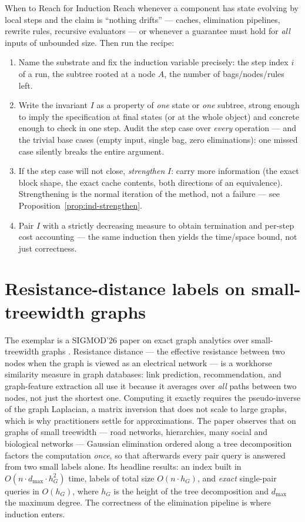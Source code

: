 \begin{reachbox}{When to Reach for Induction}
Reach whenever a component has state evolving by local steps and the claim is
``nothing drifts'' --- caches, elimination pipelines, rewrite rules, recursive
evaluators --- or whenever a guarantee must hold for \emph{all} inputs of unbounded
size. Then run the recipe:
\begin{enumerate}
\item Name the substrate and fix the induction variable precisely: the step index $i$
  of a run, the subtree rooted at a node $A$, the number of bags/nodes/rules left.
\item Write the invariant $I$ as a property of \emph{one} state or \emph{one} subtree,
  strong enough to imply the specification at final states (or at the whole object) and
  concrete enough to check in one step. Audit the step case over \emph{every} operation
  --- and the trivial base cases (empty input, single bag, zero eliminations): one
  missed case silently breaks the entire argument.
\item If the step case will not close, \emph{strengthen} $I$: carry more information
  (the exact block shape, the exact cache contents, both directions of an
  equivalence). Strengthening is the normal iteration of the method, not a failure ---
  see Proposition~\ref{prop:ind-strengthen}.
\item Pair $I$ with a strictly decreasing measure to obtain termination and per-step
  cost accounting --- the same induction then yields the time/space bound, not just
  correctness.
\end{enumerate}
\end{reachbox}

\section{Resistance-distance labels on small-treewidth graphs}
\label{sec:ind-resistance}

The exemplar is a SIGMOD'26 paper on exact graph analytics over small-treewidth graphs
\citep{sigmod26-307}. Resistance distance --- the effective resistance between two
nodes when the graph is viewed as an electrical network --- is a workhorse similarity
measure in graph databases: link prediction, recommendation, and graph-feature
extraction all use it because it averages over \emph{all} paths between two nodes, not
just the shortest one. Computing it exactly requires the pseudo-inverse of the graph
Laplacian, a matrix inversion that does not scale to large graphs, which is why
practitioners settle for approximations. The paper observes that on graphs of small
treewidth --- road networks, hierarchies, many social and biological networks ---
Gaussian elimination ordered along a tree decomposition factors the computation
\emph{once}, so that afterwards every pair query is answered from two small labels
alone. Its headline results: an index built in $O(n \cdot d_{\max} \cdot h_G^{2})$
time, labels of total size $O(n \cdot h_G)$, and \emph{exact} single-pair queries in
$O(h_G)$, where $h_G$ is the height of the tree decomposition and $d_{\max}$ the
maximum degree. The correctness of the elimination pipeline is where induction enters.


